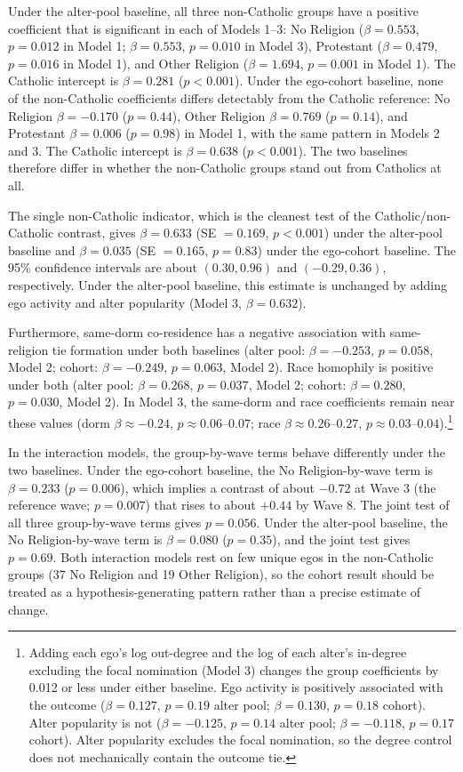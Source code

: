 \documentclass[11pt]{article}
\begin{document}
Under the alter-pool baseline, all three non-Catholic groups have a positive coefficient that is significant in each of Models 1--3: No Religion ($\beta = 0.553$, $p = 0.012$ in Model 1; $\beta = 0.553$, $p = 0.010$ in Model 3), Protestant ($\beta = 0.479$, $p = 0.016$ in Model 1), and Other Religion ($\beta = 1.694$, $p = 0.001$ in Model 1). The Catholic intercept is $\beta = 0.281$ ($p < 0.001$). Under the ego-cohort baseline, none of the non-Catholic coefficients differs detectably from the Catholic reference: No Religion $\beta = -0.170$ ($p = 0.44$), Other Religion $\beta = 0.769$ ($p = 0.14$), and Protestant $\beta = 0.006$ ($p = 0.98$) in Model 1, with the same pattern in Models 2 and 3. The Catholic intercept is $\beta = 0.638$ ($p < 0.001$). The two baselines therefore differ in whether the non-Catholic groups stand out from Catholics at all.

The single non-Catholic indicator, which is the cleanest test of the Catholic/non-Catholic contrast, gives $\beta = 0.633$ (SE $= 0.169$, $p < 0.001$) under the alter-pool baseline and $\beta = 0.035$ (SE $= 0.165$, $p = 0.83$) under the ego-cohort baseline. The 95\% confidence intervals are about $(0.30, 0.96)$ and $(-0.29, 0.36)$, respectively. Under the alter-pool baseline, this estimate is unchanged by adding ego activity and alter popularity (Model 3, $\beta = 0.632$).

Furthermore, same-dorm co-residence has a negative association with same-religion tie formation under both baselines (alter pool: $\beta = -0.253$, $p = 0.058$, Model 2; cohort: $\beta = -0.249$, $p = 0.063$, Model 2). Race homophily is positive under both (alter pool: $\beta = 0.268$, $p = 0.037$, Model 2; cohort: $\beta = 0.280$, $p = 0.030$, Model 2). In Model 3, the same-dorm and race coefficients remain near these values (dorm $\beta \approx -0.24$, $p \approx 0.06$--$0.07$; race $\beta \approx 0.26$--$0.27$, $p \approx 0.03$--$0.04$).\footnote{Adding each ego's log out-degree and the log of each alter's in-degree excluding the focal nomination (Model 3) changes the group coefficients by 0.012 or less under either baseline. Ego activity is positively associated with the outcome ($\beta = 0.127$, $p = 0.19$ alter pool; $\beta = 0.130$, $p = 0.18$ cohort). Alter popularity is not ($\beta = -0.125$, $p = 0.14$ alter pool; $\beta = -0.118$, $p = 0.17$ cohort). Alter popularity excludes the focal nomination, so the degree control does not mechanically contain the outcome tie.}

In the interaction models, the group-by-wave terms behave differently under the two baselines. Under the ego-cohort baseline, the No Religion-by-wave term is $\beta = 0.233$ ($p = 0.006$), which implies a contrast of about $-0.72$ at Wave 3 (the reference wave; $p = 0.007$) that rises to about $+0.44$ by Wave 8. The joint test of all three group-by-wave terms gives $p = 0.056$. Under the alter-pool baseline, the No Religion-by-wave term is $\beta = 0.080$ ($p = 0.35$), and the joint test gives $p = 0.69$. Both interaction models rest on few unique egos in the non-Catholic groups (37 No Religion and 19 Other Religion), so the cohort result should be treated as a hypothesis-generating pattern rather than a precise estimate of change.
\end{document}
